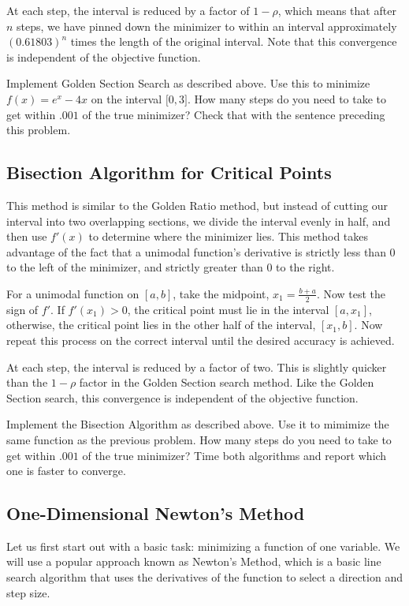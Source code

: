 At each step, the interval is reduced by a factor of $1-\rho$, which means that after $n$ steps, we have pinned down the minimizer to within an interval approximately $(0.61803)^n$ times the length of the original interval.
Note that this convergence is independent of the objective function.

\begin{problem}
Implement Golden Section Search as described above.
Use this to minimize $f(x) = e^x - 4x$ on the interval $\lbrack 0, 3 \rbrack$.
How many steps do you need to take to get within $.001$ of the true minimizer? Check that with the sentence preceding this problem.
\end{problem}

\subsection*{Bisection Algorithm for Critical Points}
This method is similar to the Golden Ratio method, but instead of cutting our interval into two overlapping sections, we divide the interval evenly in half, and then use $f'(x)$ to determine where the minimizer lies.
This method takes advantage of the fact that a unimodal function's derivative is strictly less than 0 to the left of the minimizer, and strictly greater than 0 to the right.

For a unimodal function on $[a, b]$, take the midpoint, $x_1 = \frac{b + a}{2}$.
Now test the sign of $f'$.
If $f'(x_1) > 0$, the critical point must lie in the interval $[a, x_1]$, otherwise, the critical point lies in the other half of the interval, $[x_1, b]$.
Now repeat this process on the correct interval until the desired accuracy is achieved.

At each step, the interval is reduced by a factor of two.
This is slightly quicker than the $1-\rho$ factor in the Golden Section search method.
Like the Golden Section search, this convergence is independent of the objective function.

\begin{problem}
Implement the Bisection Algorithm as described above.
Use it to mimimize the same function as the previous problem.
How many steps do you need to take to get within $.001$ of the true minimizer?
Time both algorithms and report which one is faster to converge.
\end{problem}

\subsection*{One-Dimensional Newton's Method}
Let us first start out with a basic task: minimizing a function of one variable.
We will use a popular approach known as Newton's Method, which is a basic line search algorithm that uses the derivatives of the function to select a direction and step size.

